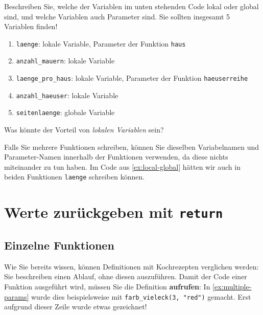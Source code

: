 \begin{myexercise}\label{ex:local-global}
	Beschreiben Sie, welche der Variablen im unten stehenden Code lokal oder global sind, und welche Variablen auch Parameter sind. Sie sollten insgesamt 5 Variablen finden!
	

	\begin{myanswer}
		\begin{enumerate}
			\item \lstinline|laenge|: lokale Variable, Parameter der Funktion \lstinline|haus|
			\item \lstinline|anzahl_mauern|: lokale Variable
			\item \lstinline|laenge_pro_haus|: lokale Variable, Parameter der Funktion \lstinline|haeuserreihe|
			\item \lstinline|anzahl_haeuser|: lokale Variable
			\item \lstinline|seitenlaenge|: globale Variable
		\end{enumerate}
	\end{myanswer}
\end{myexercise}

\begin{myexercise}
	Was könnte der Vorteil von \textit{lokalen Variablen} sein?
	\begin{myanswer}
		Falls Sie mehrere Funktionen schreiben, können Sie dieselben Variabelnamen und Parameter-Namen innerhalb der Funktionen verwenden, da diese nichts miteinander zu tun haben. Im Code aus \cref{ex:local-global} hätten wir auch in beiden Funktionen \texttt{laenge} schreiben können.
	\end{myanswer}
\end{myexercise}


\section{Werte zurückgeben mit \texorpdfstring{\lstinline|return|}{return}}
\subsection{Einzelne Funktionen}
Wie Sie bereits wissen, können Definitionen mit Kochrezepten verglichen werden: Sie beschreiben einen Ablauf, ohne diesen auszuführen. Damit der Code einer Funktion ausgeführt wird, müssen Sie die Definition \textbf{aufrufen}: In \cref{ex:multiple-params} wurde dies beispielsweise mit \lstinline|farb_vieleck(3, "red")| gemacht. Erst aufgrund dieser Zeile wurde etwas gezeichnet!

